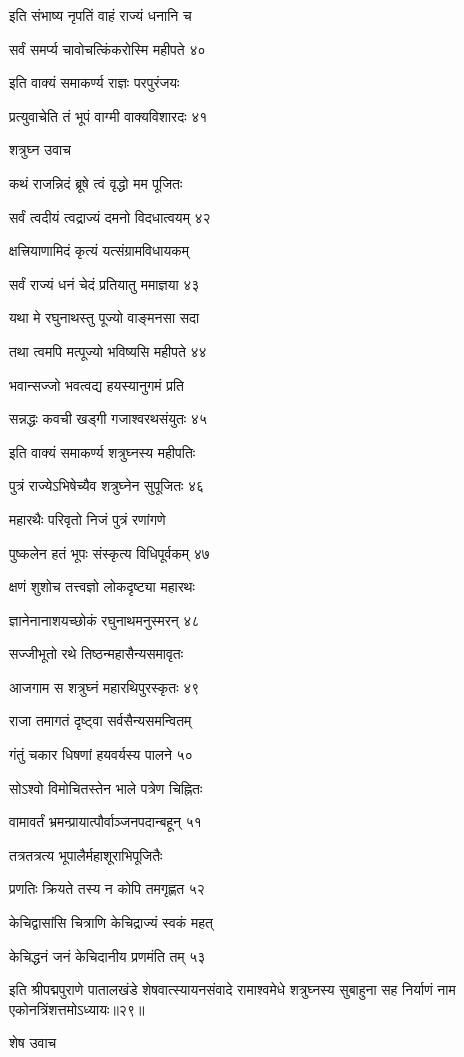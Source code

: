 इति संभाष्य नृपतिं वाहं राज्यं धनानि च

सर्वं समर्प्य चावोचत्किंकरोस्मि महीपते ४०

इति वाक्यं समाकर्ण्य राज्ञः परपुरंजयः

प्रत्युवाचेति तं भूपं वाग्मी वाक्यविशारदः ४१

शत्रुघ्न उवाच

कथं राजन्निदं ब्रूषे त्वं वृद्धो मम पूजितः

सर्वं त्वदीयं त्वद्राज्यं दमनो विदधात्वयम् ४२

क्षत्त्रियाणामिदं कृत्यं यत्संग्रामविधायकम्

सर्वं राज्यं धनं चेदं प्रतियातु ममाज्ञया ४३

यथा मे रघुनाथस्तु पूज्यो वाङ्मनसा सदा

तथा त्वमपि मत्पूज्यो भविष्यसि महीपते ४४

भवान्सज्जो भवत्वद्य हयस्यानुगमं प्रति

सन्नद्धः कवची खड्गी गजाश्वरथसंयुतः ४५

इति वाक्यं समाकर्ण्य शत्रुघ्नस्य महीपतिः

पुत्रं राज्येऽभिषेच्यैव शत्रुघ्नेन सुपूजितः ४६

महारथैः परिवृतो निजं पुत्रं रणांगणे

पुष्कलेन हतं भूपः संस्कृत्य विधिपूर्वकम् ४७

क्षणं शुशोच तत्त्वज्ञो लोकदृष्ट्या महारथः

ज्ञानेनानाशयच्छोकं रघुनाथमनुस्मरन् ४८

सज्जीभूतो रथे तिष्ठन्महासैन्यसमावृतः

आजगाम स शत्रुघ्नं महारथिपुरस्कृतः ४९

राजा तमागतं दृष्ट्वा सर्वसैन्यसमन्वितम्

गंतुं चकार धिषणां हयवर्यस्य पालने ५०

सोऽश्वो विमोचितस्तेन भाले पत्रेण चिह्नितः

वामावर्तं भ्रमन्प्रायात्पौर्वाञ्जनपदान्बहून् ५१

तत्रतत्रत्य भूपालैर्महाशूराभिपूजितैः

प्रणतिः क्रियते तस्य न कोपि तमगृह्णत ५२

केचिद्वासांसि चित्राणि केचिद्राज्यं स्वकं महत्

केचिद्धनं जनं केचिदानीय प्रणमंति तम् ५३

इति श्रीपद्मपुराणे पातालखंडे शेषवात्स्यायनसंवादे रामाश्वमेधे शत्रुघ्नस्य सुबाहुना सह निर्याणं नाम एकोनत्रिंशत्तमोऽध्यायः॥२९॥


शेष उवाच

